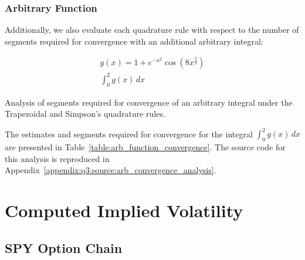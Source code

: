 \documentclass[10pt]{article}
\newcommand*\lstinputpath[1]{\lstset{inputpath=#1}} %
\begin{document}
        \subsubsection{Arbitrary Function}

        Additionally, we also evaluate each quadrature rule with respect to the number of segments required for convergence with an additional arbitrary integral:
        
        \begin{gather*}
            g(x) = 1 + e^{-x^{2}} \cos{(8x^{\frac{2}{3}})} \\
            \int_0^2 g(x) \, dx
        \end{gather*}

        \begin{table}[h]
            \centering
            \caption{Analysis of segments required for convergence of an arbitrary integral under the Trapezoidal and Simpson's quadrature rules.}
            \label{table:arb_function_convergence}
        \end{table}

        The estimates and segments required for convergence for the integral $\int_0^2 g(x) \, dx$ are presented in Table~\ref{table:arb_function_convergence}. The source code for this analysis is reproduced in Appendix~\ref{appendix:q3:source:arb_convergence_analysis}.




\newpage

\printbibliography



\newpage

\appendix %

\lstinputpath{}

\section{Computed Implied Volatility} \label{appendix:q2:imp_vol}
        
    \subsection{SPY Option Chain} \label{appendix:q2:spy_vol}
    
\end{document}

